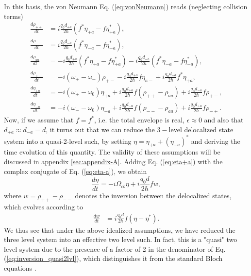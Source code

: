 \documentclass[]{spie}  %
\begin{document}
In this basis, the von Neumann Eq. (\ref{eq:vonNeumann}) reads (neglecting collision terms)
\begin{subequations}
\begin{align}
\frac{d \rho_{++}}{dt} &= i\frac{q_0d_{+a}}{2\hbar}(f^*\eta_{+a}-f\eta_{+a}^*), \\
\frac{d \rho_{--}}{dt} &= i\frac{q_0d_{-a}}{2\hbar}(f^*\eta_{-a}-f\eta_{-a}^*), \\
\frac{d \rho_{aa}}{dt} &= -i\frac{q_0d_{+a}}{2\hbar}(f^*\eta_{+a}-f\eta_{+a}^*)-i\frac{q_0d_{-a}}{2\hbar}(f^*\eta_{-a}-f\eta_{-a}^*), \\
\frac{d \rho_{+-}}{dt} &= -i(\omega_+-\omega_-)\rho_{+-}-i\frac{q_0d_{+a}}{2\hbar}f\eta_{a-}+i\frac{q_0d_{-a}}{2\hbar}f^*\eta_{+a},\\
\frac{d \eta_{+a}}{dt} &= -i(\omega_+-\omega_0)\eta_{+a}+i\frac{q_0d_{+a}}{2\hbar}f(\rho_{++}-\rho_{aa})+i\frac{q_0d_{-a}}{2\hbar}f\rho_{+-}, \label{eq:eta+a}\\
\frac{d \eta_{-a}}{dt} &= -i(\omega_--\omega_0)\eta_{-a}+i\frac{q_0d_{-a}}{2\hbar}f(\rho_{--}-\rho_{aa})+i\frac{q_0d_{+a}}{2\hbar}f\rho_{-+}. \label{eq:eta-a}
\end{align}
\end{subequations}
Now, if we assume that $f = f^*$, i.e. the total envelope is real,  $\epsilon \approx 0$ and also that $d_{+a}\approx d_{-a} = d$, it turns out that we can reduce the $3-$level delocalized state system into a quasi-2-level such, by setting  $\eta = \eta_{+a}+(\eta_{-a})^*$ and deriving the time evolution of this quantity. The validity of these assumptions will be discussed in appendix \ref{sec:appendix-A}. Adding Eq. (\ref{eq:eta+a}) with the complex conjugate of Eq. (\ref{eq:eta-a}), we obtain
\begin{equation}
\label{eq:coherence_quasi2lvl}
\frac{d \eta}{dt} = -i\Omega_{cb} \eta + i\frac{q_0d}{2\hbar}fw, 
\end{equation}
where $w = \rho_{++}-\rho_{--}$ denotes the inversion between the delocalized states, which	 evolves according to 
\begin{align}
\label{eq:inversion_quasi2lvl}
\frac{d w }{dt}	&=  i\frac{q_0d}{2\hbar}f(\eta-\eta^*).
\end{align}
We thus see that under the above idealized assumptions, we have reduced the three level system into an effective two level such. In fact, this is a "quasi" two level system due to the presence of a factor of 2 in the denominator of Eq. (\ref{eq:inversion_quasi2lvl}), which distinguishes it from the standard Bloch equations \cite{boyd2003nonlinear}.
\end{document}
